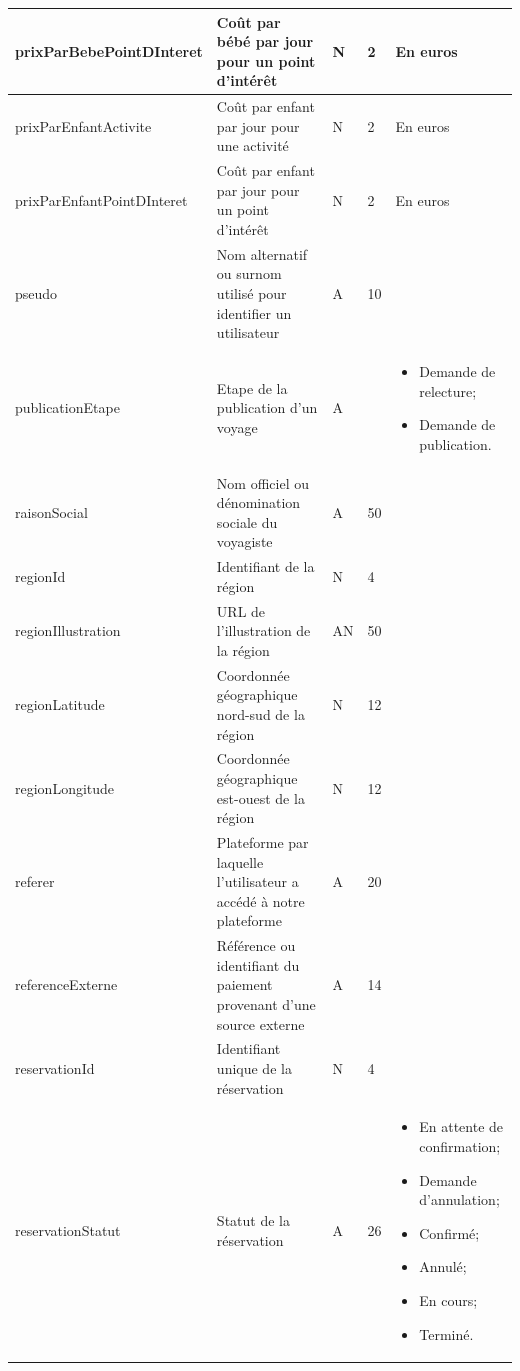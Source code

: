 \documentclass[12pt]{report}
\begin{document}
\begin{longtable}{|p{4cm}|p{4cm}|p{1cm}|p{1cm}|p{4cm}|}
				\hline
				prixParBebePointDInteret & Coût par bébé par jour pour un point d'intérêt & N & 2 & En euros \\						
				\hline
				prixParEnfantActivite & Coût par enfant par jour pour une activité & N & 2 & En euros \\						
				\hline
				prixParEnfantPointDInteret & Coût par enfant par jour pour un point d'intérêt & N & 2 & En euros \\						
				\hline
				pseudo & Nom alternatif ou surnom utilisé pour identifier un utilisateur & A & 10 & \\						
				\hline
				publicationEtape & Etape de la publication d'un voyage & A &  & \begin{itemize} \item Demande de relecture; \item Demande de publication. \end{itemize} \\						
				\hline
				raisonSocial & Nom officiel ou dénomination sociale du voyagiste & A & 50 & \\						
				\hline
				regionId & Identifiant de la région & N & 4 & \\						
				\hline
				regionIllustration & URL de l'illustration de la région & AN & 50 & \\						
				\hline
				regionLatitude & Coordonnée géographique nord-sud de la région & N & 12 & \\						
				\hline
				regionLongitude & Coordonnée géographique est-ouest de la région & N & 12 & \\						
				\hline
				referer & Plateforme par laquelle l'utilisateur a accédé à notre plateforme & A & 20 & \\						
				\hline
				referenceExterne & Référence ou identifiant du paiement provenant d'une source externe & A & 14 & \\						
				\hline
				reservationId & Identifiant unique de la réservation & N & 4 & \\						
				\hline
				reservationStatut & Statut de la réservation & A & 26 & \begin{itemize} \item En attente de confirmation; \item Demande d'annulation; \item Confirmé; \item Annulé; \item En cours; \item Terminé. \end{itemize} \\						

\end{longtable}
\end{document}
